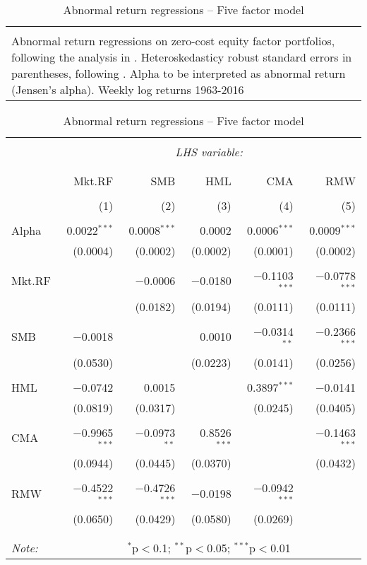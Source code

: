 \begin{table}[!htbp] \centering 
  \caption{Abnormal return regressions -- Five factor model} 
  \label{fig:abnormal_five} 
\begin{tabularx}{\textwidth}{X}
\\[-1.8ex]\toprule
\\[-1.8ex] 
\footnotesize Abnormal return regressions on zero-cost equity factor portfolios, following the analysis in \textcite{FF2015}. Heteroskedasticy robust standard errors in parentheses, following \textcite{White1982}. Alpha to be interpreted as abnormal return (Jensen's alpha). Weekly log returns 1963-2016
\end{tabularx}
\begin{tabularx}{\textwidth}{@{\extracolsep{5pt}}X rrrrr} 
\\[-1.8ex]\midrule 
\\[-1.8ex] 
  & \multicolumn{5}{c}{\textit{LHS variable:}} \\ 
\cline{2-6} 
\\[-1.8ex] & \multicolumn{5}{c}{ } \\ 
 & Mkt.RF & SMB & HML & CMA & RMW \\ 
\\[-1.8ex] & (1) & (2) & (3) & (4) & (5)\\ 
\hline \\[-1.8ex] 
 Alpha & 0.0022$^{***}$ & 0.0008$^{***}$ & 0.0002 & 0.0006$^{***}$ & 0.0009$^{***}$ \\ 
  & (0.0004) & (0.0002) & (0.0002) & (0.0001) & (0.0002) \\ 
  & & & & & \\ 
 Mkt.RF &  & $-$0.0006 & $-$0.0180 & $-$0.1103$^{***}$ & $-$0.0778$^{***}$ \\ 
  &  & (0.0182) & (0.0194) & (0.0111) & (0.0111) \\ 
  & & & & & \\ 
 SMB & $-$0.0018 &  & 0.0010 & $-$0.0314$^{**}$ & $-$0.2366$^{***}$ \\ 
  & (0.0530) &  & (0.0223) & (0.0141) & (0.0256) \\ 
  & & & & & \\ 
 HML & $-$0.0742 & 0.0015 &  & 0.3897$^{***}$ & $-$0.0141 \\ 
  & (0.0819) & (0.0317) &  & (0.0245) & (0.0405) \\ 
  & & & & & \\ 
 CMA & $-$0.9965$^{***}$ & $-$0.0973$^{**}$ & 0.8526$^{***}$ &  & $-$0.1463$^{***}$ \\ 
  & (0.0944) & (0.0445) & (0.0370) &  & (0.0432) \\ 
  & & & & & \\ 
 RMW & $-$0.4522$^{***}$ & $-$0.4726$^{***}$ & $-$0.0198 & $-$0.0942$^{***}$ &  \\ 
  & (0.0650) & (0.0429) & (0.0580) & (0.0269) &  \\ 
  & & & & & \\ 
\bottomrule \\[-1.8ex] 
\textit{Note:}  & \multicolumn{5}{c}{$^{*}$p$<$0.1; $^{**}$p$<$0.05; $^{***}$p$<$0.01} \\ 
\end{tabularx} 
\end{table}

